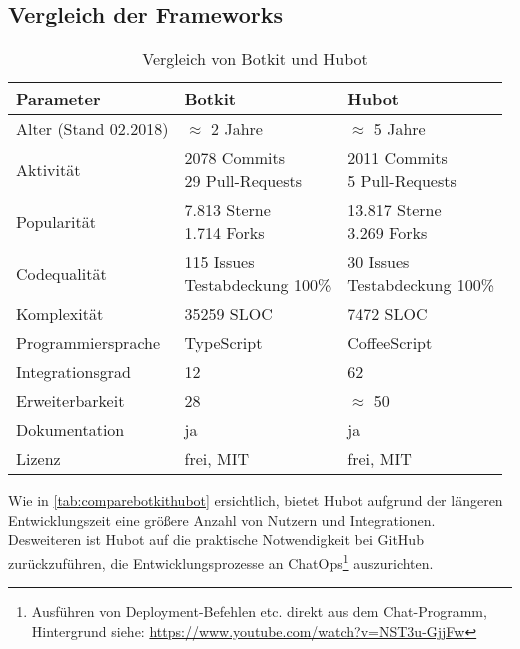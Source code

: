 \subsection{Vergleich der Frameworks}


\begin{table}[htbp]
    \centering
    \begin{tabularx}{\textwidth}{|l|X|X|}
        \hline
        \textbf{Parameter} & \textbf{Botkit} & \textbf{Hubot} \\
        \hline
        Alter (Stand 02.2018) & $\approx$ 2 Jahre & $\approx$ 5 Jahre \\
        \hline
        Aktivität & \makecell[l]{2078 Commits\\ 29 Pull-Requests} & \makecell[l]{2011 Commits\\ 5 Pull-Requests} \\
        \hline
        Popularität & \makecell[l]{7.813 Sterne\\ 1.714 Forks} & \makecell[l]{13.817 Sterne\\ 3.269 Forks} \\
        \hline
        Codequalität & \makecell[l]{115 Issues\\ Testabdeckung 100\%} & \makecell[l]{30 Issues\\ Testabdeckung 100\%} \\
        \hline
        Komplexität & 35259 SLOC & 7472 SLOC \\
        \hline
        Programmiersprache & TypeScript & CoffeeScript \\
        \hline
        Integrationsgrad & 12 & 62 \\
        \hline
        Erweiterbarkeit & 28 & $\approx$ 50 \\
        \hline
        Dokumentation & ja & ja \\
        \hline
        Lizenz & frei, MIT & frei, MIT \\
        \hline
    \end{tabularx}
    \caption{Vergleich von Botkit und Hubot}
    \label{tab:comparebotkithubot}
\end{table}


Wie in \autoref{tab:comparebotkithubot} ersichtlich, bietet Hubot aufgrund der längeren Entwicklungszeit eine größere Anzahl von Nutzern und Integrationen. Desweiteren ist Hubot auf die praktische Notwendigkeit bei GitHub zurückzuführen, die Entwicklungsprozesse an ChatOps\footnote{Ausführen von Deployment-Befehlen etc. direkt aus dem Chat-Programm, Hintergrund siehe: \url{https://www.youtube.com/watch?v=NST3u-GjjFw}} auszurichten.

